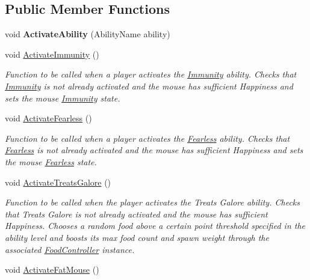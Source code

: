 \subsection*{Public Member Functions}
\begin{DoxyCompactItemize}
\item 
void {\bfseries Activate\+Ability} (Ability\+Name ability)\hypertarget{class_ability_controller_afb5f4f4c49337dcc4dfc1e52c0ff93c0}{}\label{class_ability_controller_afb5f4f4c49337dcc4dfc1e52c0ff93c0}

\item 
void \hyperlink{class_ability_controller_ab239b2b0f79e5f8036ffd92a60953976}{Activate\+Immunity} ()
\begin{DoxyCompactList}\small\item\em Function to be called when a player activates the \hyperlink{class_immunity}{Immunity} ability. Checks that \hyperlink{class_immunity}{Immunity} is not already activated and the mouse has sufficient Happiness and sets the mouse \hyperlink{class_immunity}{Immunity} state. \end{DoxyCompactList}\item 
void \hyperlink{class_ability_controller_a3871b151f0dbb4f695b326cb2c02c29c}{Activate\+Fearless} ()
\begin{DoxyCompactList}\small\item\em Function to be called when a player activates the \hyperlink{class_fearless}{Fearless} ability. Checks that \hyperlink{class_fearless}{Fearless} is not already activated and the mouse has sufficient Happiness and sets the mouse \hyperlink{class_fearless}{Fearless} state. \end{DoxyCompactList}\item 
void \hyperlink{class_ability_controller_aa69b2c81a09b53e0a56f69d58b11007c}{Activate\+Treats\+Galore} ()
\begin{DoxyCompactList}\small\item\em Function to be called when the player activates the Treats Galore ability. Checks that Treats Galore is not already activated and the mouse has sufficient Happiness. Chooses a random food above a certain point threshold specified in the ability level and boosts its max food count and spawn weight through the associated \hyperlink{class_food_controller}{Food\+Controller} instance. \end{DoxyCompactList}\item 
void \hyperlink{class_ability_controller_af617ab2ad1e66f4fbe70e47d41f42c5d}{Activate\+Fat\+Mouse} ()

\end{DoxyCompactItemize}
